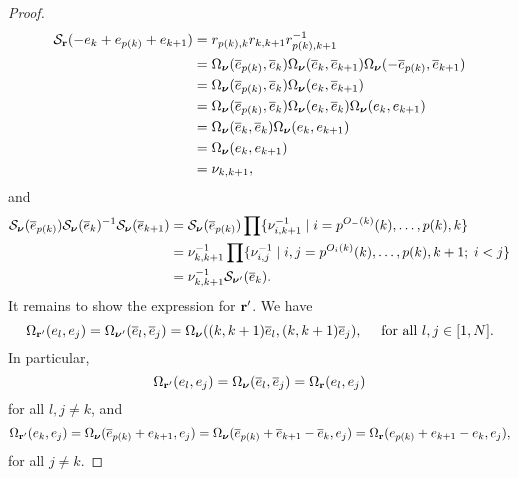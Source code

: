 \begin{proof}
\begin{align*}
		\mathcal{S}_{\mathbf{r}}(-e_k + e_{p(k)} + e_{k+1})
		 & = r_{p(k),k}r_{k,k+1}r_{p(k), k+1}^{-1}                                                                 \\
		 & = \Omega_{\boldsymbol{\nu}}(\overline{e}_{p(k)}, \overline{e}_k)\Omega_{\boldsymbol{\nu}}(\overline{e}_k, \overline{e}_{k+1})\Omega_{\boldsymbol{\nu}}(-\overline{e}_{p(k)}, \overline{e}_{k+1}) \\
		 & = \Omega_{\boldsymbol{\nu}}(\overline{e}_{p(k)}, \overline{e}_k)\Omega_{\boldsymbol{\nu}}(e_k, \overline{e}_{k+1})                                        \\
		 & = \Omega_{\boldsymbol{\nu}}(\overline{e}_{p(k)}, \overline{e}_k)\Omega_{\boldsymbol{\nu}}(e_k, \overline{e}_{k})\Omega_{\boldsymbol{\nu}}(e_k, e_{k+1})               \\
		 & = \Omega_{\boldsymbol{\nu}}(\overline{e}_{k}, \overline{e}_k)\Omega_{\boldsymbol{\nu}}(e_k, e_{k+1})                                             \\
		 & = \Omega_{\boldsymbol{\nu}}(e_k, e_{k+1})                                                                          \\
		 & = \nu_{k, k+1},
	\end{align*}
	and
	\begin{align*}
		\mathcal{S}_{\boldsymbol{\nu}}(\overline{e}_{p(k)})\mathcal{S}_{\boldsymbol{\nu}}(\overline{e}_k)^{-1} \mathcal{S}_{\boldsymbol{\nu}}(\overline{e}_{k+1})
		 & = \mathcal{S}_{\boldsymbol{\nu}}(\overline{e}_{p(k)})\prod \{\nu_{i, k+1}^{-1} \mid i = p^{O_{-}(k)}(k), \dots, p(k), k\}        \\
		 & = \nu_{k, k+1}^{-1}  \prod \{\nu_{i, j}^{-1} \mid i,j = p^{O_{i}(k)}(k), \dots, p(k), k+1; \; i < j\} \\
		 & = \nu_{k, k+1}^{-1}\mathcal{S}_{\boldsymbol{\nu}'}(\overline{e}_k).
	\end{align*}
	It remains to show the expression for $\mathbf{r}'$. We have
	\begin{equation*}
		\Omega_{\mathbf{r}'}(e_l, e_j) = \Omega_{\boldsymbol{\nu}'}(\overline{e}_l, \overline{e}_j) = \Omega_{\boldsymbol{\nu}}((k, k+1)\overline{e}_l, (k, k+1)\overline{e}_j), \quad \text{ for all } l,j \in [1, N].
	\end{equation*}
	In particular,
	\begin{equation*}
		\Omega_{\mathbf{r}'}(e_l, e_j) = \Omega_{\boldsymbol{\nu}}(\overline{e}_l, \overline{e}_j) = \Omega_{\mathbf{r}}(e_l, e_j)
	\end{equation*}
	for all $l, j \neq k$, and
	\begin{equation*}
		\Omega_{\mathbf{r}'}(e_k, e_j) = \Omega_{\boldsymbol{\nu}}(\overline{e}_{p(k)} + e_{k+1}, e_j) = \Omega_{\boldsymbol{\nu}}(\overline{e}_{p(k)} + \overline{e}_{k+1} - \overline{e}_k, e_j) = \Omega_{\mathbf{r}}(e_{p(k)} + e_{k+1} - e_k , e_j),
	\end{equation*}
	for all $j \neq k$.
\end{proof}

